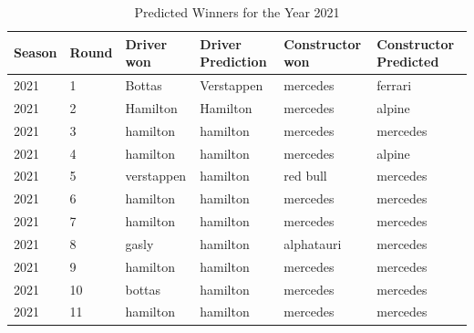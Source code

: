 \documentclass[11pt,article,oneside]{article}
\begin{document}
\begin{table}[htbp]
    \centering
    \caption{Predicted Winners for the Year 2021}
    \label{tab:predicted_mvp_shares}
    \begin{tabular}{|l|l|l|l|l|l|}
    \hline
    \textbf{Season}  & \textbf{Round}  & \textbf{Driver won} & \textbf{Driver Prediction} & \textbf{Constructor won} &\textbf{Constructor Predicted} \\ \hline
    2021             & 1              & Bottas              & Verstappen                  & mercedes                 & ferrari                       \\ \hline
    2021             & 2              & Hamilton            & Hamilton                    & mercedes                 & alpine                        \\ \hline
    2021             & 3              & hamilton            & hamilton                    & mercedes                 & mercedes                         \\ \hline
    2021             & 4              & hamilton            & hamilton                    & mercedes                 & alpine                          \\ \hline
    2021             & 5              & verstappen          & hamilton                    & red bull                 & mercedes                           \\ \hline
    2021             & 6              & hamilton            & hamilton                    & mercedes                 & mercedes                            \\ \hline
    2021             & 7              & hamilton            & hamilton                    & mercedes                 & mercedes                             \\ \hline
    2021             & 8              & gasly               & hamilton                    & alphatauri                 & mercedes                              \\ \hline
    2021             & 9              & hamilton            & hamilton                    & mercedes                 & mercedes                               \\ \hline
    2021             & 10             & bottas              & hamilton                    & mercedes                 & mercedes                                \\ \hline
    2021             & 11             & hamilton            & hamilton                    & mercedes                 & mercedes                                 \\ \hline

\end{tabular}
\end{table}
\end{document}
